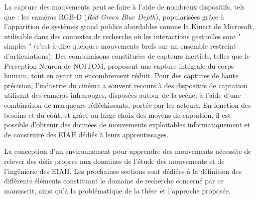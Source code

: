 La capture des mouvements peut se faire à l'aide de nombreux dispositifs, tels que : les caméras RGB-D (\textit{Red Green Blue Depth}), popularisées grâce à l'apparition de systèmes grand publics abordables comme la Kinect de Microsoft, utilisable dans des contextes de recherche où les interactions gestuelles sont " simples " (c'est-à-dire quelques mouvements brefs sur un ensemble restreint d'articulations). Des combinaisons constituées de capteurs inertiels, telles que le Perception Neuron de NOITOM, proposent une capture intégrale du corps humain, tout en ayant un encombrement réduit. Pour des captures de haute précision, l'industrie du cinéma a souvent recours à des dispositifs de captation utilisant des caméras infrarouges, disposées autour de la scène, à l'aide d'une combinaison de marqueurs réfléchissants, portée par les acteurs. En fonction des besoins et du coût, et grâce au large choix des moyens de captation, il est possible d'obtenir des données de mouvements exploitables informatiquement et de construire des EIAH dédiés à leurs apprentissages.

La conception d'un environnement pour apprendre des mouvements nécessite de relever des défis propres aux domaines de l'étude des mouvements et de l'ingénierie des EIAH. Les prochaines sections sont dédiées à la définition des différents éléments constituant le domaine de recherche concerné par ce manuscrit, ainsi qu'à la problématique de la thèse et l'approche proposée.\\

